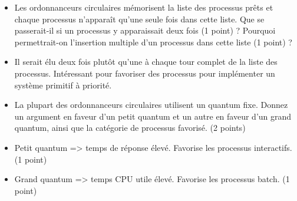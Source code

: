 \begin{itemize}
  \item Les ordonnanceurs circulaires m\'emorisent la liste des processus prêts et chaque processus n'apparaît qu'une seule fois dans cette liste. Que se passerait-il si un processus y apparaissait deux fois (1 point) ? Pourquoi permettrait-on l'insertion multiple d'un processus dans cette liste (1 point) ?
\end{itemize}

\begin{correction}

\begin{itemize}
\item Il serait \'elu deux fois plutôt qu'une \`a chaque tour complet de la liste des processus. Int\'eressant pour favoriser des processus pour impl\'ementer un syst\`eme primitif \`a priorit\'e.
\end{itemize}

\end{correction}

\begin{itemize}
  \item La plupart des ordonnanceurs circulaires utilisent un quantum fixe. Donnez un argument en faveur d'un petit quantum et un autre en faveur d'un grand quantum, ainsi que la cat\'egorie de processus favoris\'e. (2 points)
\end{itemize}

\begin{correction}

\begin{itemize}
  \item Petit quantum => temps de r\'eponse \'elev\'e. Favorise les processus interactifs.  (1 point)
  \item Grand quantum => temps CPU utile \'elev\'e. Favorise les processus batch. (1 point)
\end{itemize}

\end{correction}

